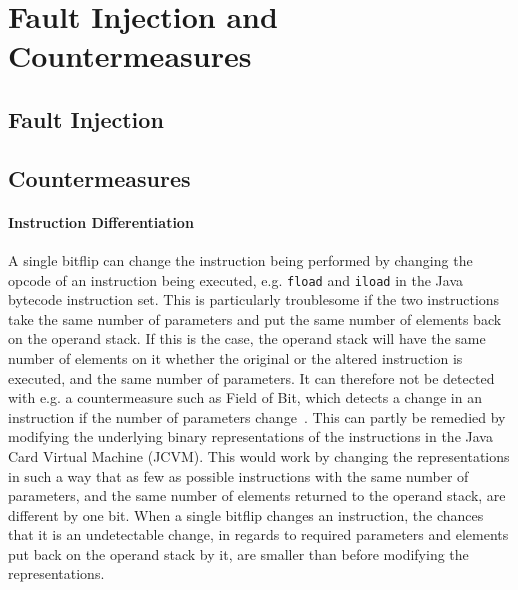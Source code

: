 \section{Fault Injection and Countermeasures}
\subsection{Fault Injection}
\subsection{Countermeasures}
\paragraph{Instruction Differentiation} 
A single bitflip can change the instruction being performed by changing the opcode of an instruction being executed, e.g. \texttt{fload} and \texttt{iload} in the Java bytecode instruction set. This is particularly troublesome if the two instructions take the same number of parameters and put the same number of elements back on the operand stack. If this is the case, the operand stack will have the same number of elements on it whether the original or the altered instruction is executed, and the same number of parameters. It can therefore not be detected with e.g. a countermeasure such as Field of Bit, which detects a change in an instruction if the number of parameters change~\cite[p. 16]{javasec}.
This can partly be remedied by modifying the underlying binary representations of the instructions in the Java Card Virtual Machine (JCVM).
This would work by changing the representations in such a way that as few as possible instructions with the same number of parameters, and the same number of elements returned to the operand stack, are different by one bit. 
When a single bitflip changes an instruction, the chances that it is an undetectable change, in regards to required parameters and elements put back on the operand stack by it, are smaller than before modifying the representations.

